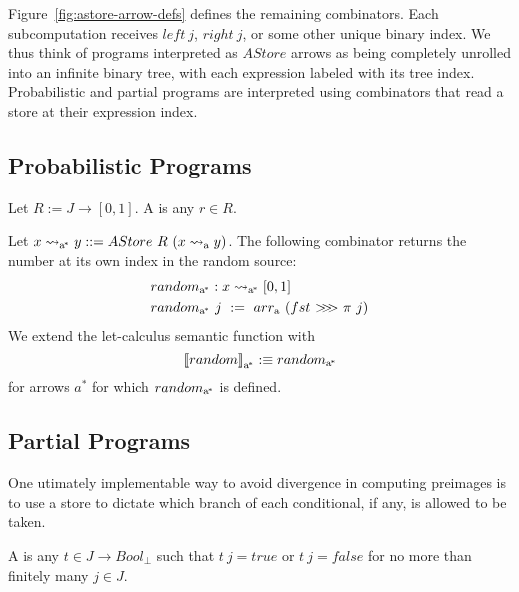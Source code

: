 \documentclass[preprint]{sigplanconf}
\newcommand{\arrow}{\rightsquigarrow}
\newcommand{\arrowarr}{\ensuremath{arr}}
\newcommand{\arrowcomp}{\ensuremath{{>}\mspace{-6mu}{>}\mspace{-6mu}{>}}}
\newcommand{\gen}{_\mathrm{a}}
\newcommand{\genc}{_\mathrm{a^{\mspace{-2mu}*}}}
\begin{document}
Figure~\ref{fig:astore-arrow-defs} defines the remaining combinators.
Each subcomputation receives $left~j$, $right~j$, or some other unique binary index.
We thus think of programs interpreted as $AStore$ arrows as being completely unrolled into an infinite binary tree, with each expression labeled with its tree index.
Probabilistic and partial programs are interpreted using combinators that read a store at their expression index.

\subsection{Probabilistic Programs}
\label{sec:probabilistic-programs}

\begin{definition}
Let $R := J \to [0,1]$.
A  is any $r \in R$.
\end{definition}

Let $x \arrow\genc y ::= AStore~R~(x \arrow\gen y)$.
The following combinator returns the number at its own index in the random source:
\begin{equation}
\begin{aligned}
	&random\genc : x \arrow\genc [0,1] \\
	&random\genc~j \ := \ \arrowarr\gen~(fst~\arrowcomp~\pi~j)
\end{aligned}
\end{equation}
We extend the let-calculus semantic function with
\begin{equation}
	\meaningof{random}\genc :\equiv random\genc
\end{equation}
for arrows $a^*$ for which $random\genc$ is defined.

\subsection{Partial Programs}
\label{sec:partial-programs}

One utimately implementable way to avoid divergence in computing preimages is to use a store to dictate which branch of each conditional, if any, is allowed to be taken.

\begin{definition}
A  is any $t \in J \to Bool_\bot$ such that $t~j = true$ or $t~j = false$ for no more than finitely many $j \in J$.
\end{definition}
\end{document}
